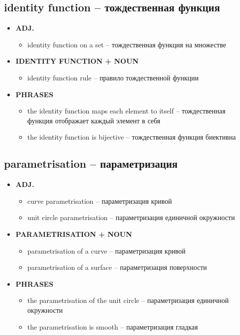 \documentclass[a4paper, 10pt]{article}
\theoremstyle{definition}
\theoremstyle{plain}
\theoremstyle{remark}
\begin{document}
\subsection{identity function – тождественная функция}

\begin{itemize}
    \item \textbf{ADJ.}
    \begin{itemize}
        \item identity function on a set – тождественная функция на множестве
    \end{itemize}
    
    \item \textbf{IDENTITY FUNCTION + NOUN}
    \begin{itemize}
        \item identity function rule – правило тождественной функции
    \end{itemize}
    
    \item \textbf{PHRASES}
    \begin{itemize}
        \item the identity function maps each element to itself – тождественная функция отображает каждый элемент в себя
        \item the identity function is bijective – тождественная функция биективна
    \end{itemize}
\end{itemize}

\subsection{parametrisation – параметризация}

\begin{itemize}
    \item \textbf{ADJ.}
    \begin{itemize}
        \item curve parametrisation – параметризация кривой
        \item unit circle parametrisation – параметризация единичной окружности
    \end{itemize}
    
    \item \textbf{PARAMETRISATION + NOUN}
    \begin{itemize}
        \item parametrisation of a curve – параметризация кривой
        \item parametrisation of a surface – параметризация поверхности
    \end{itemize}
    
    \item \textbf{PHRASES}
    \begin{itemize}
        \item the parametrisation of the unit circle – параметризация единичной окружности
        \item the parametrisation is smooth – параметризация гладкая
    \end{itemize}
\end{itemize}
\end{document}
